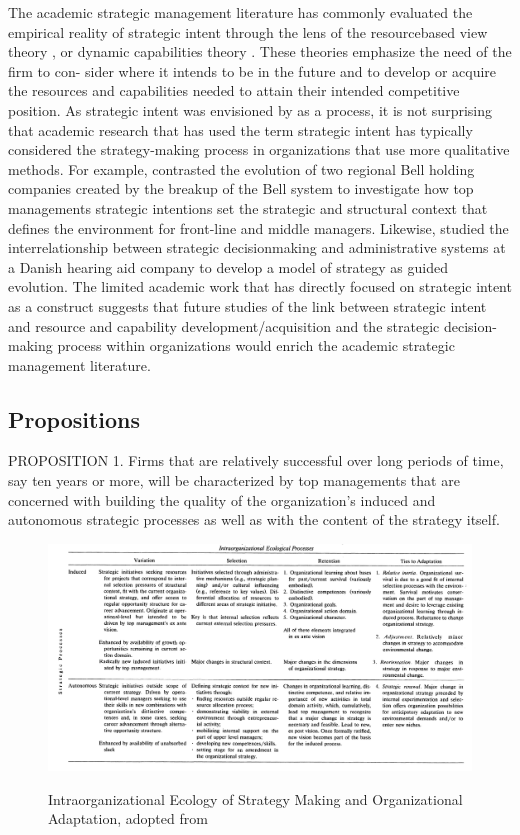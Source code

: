\documentclass[12pt,letterpaper]{article}
\begin{document}
The academic strategic management literature has commonly evaluated the empirical reality of strategic intent through the lens of the resourcebased view theory \citep{Barney1991}, or dynamic capabilities theory \citep{Teece1997}. These theories emphasize the need of the firm to con- sider where it intends to be in the future and to develop or acquire the resources and capabilities needed to attain their intended competitive position. As strategic intent was envisioned by \cite{Hamel1989} as a process, it is not surprising that academic research that has used the term strategic intent has typically considered the strategy-making process in organizations that use more qualitative methods. For example, \cite{Noda1996} contrasted the evolution of two regional Bell holding companies created by the breakup of the Bell system to investigate how top management\textquotesingle s strategic intentions set the strategic and structural context that defines the environment for front-line and middle managers. Likewise, \cite{Lovas2000} studied the interrelationship between strategic decisionmaking and administrative systems at a Danish hearing aid company to develop a model of strategy as guided evolution. The limited academic work that has directly focused on strategic intent as a construct suggests that future studies of the link between strategic intent and resource and capability development/acquisition and the strategic decision-making process within organizations would enrich the academic strategic management literature.
\subsection{\cite{Burgelman1991} Propositions}
PROPOSITION 1. Firms that are relatively successful over long periods of time, say ten years or more, will be characterized by top managements that are concerned with building the quality of the organization's induced and autonomous strategic processes as well as with the content of the strategy itself.

\begin{figure}[h]
\begin{centering}
  \caption{Intraorganizational Ecology of Strategy Making and Organizational Adaptation, adopted from \cite{Burgelman1991}}
  \includegraphics[width=\textwidth]{Burgelman1991}
  \label{fig:Burgelman1991}
\end{centering}
\end{figure}
\end{document}
